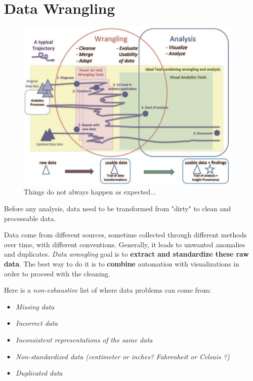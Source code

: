 
\section{Data Wrangling}

\begin{figure}[H]%
 \centering
 \includegraphics[width=12cm]{./img/03/path_data_wrangling}
 \caption{\label{path_data_wrangling}Things do not always happen as expected...}
\end{figure}

Before any analysis, data need to be transformed from "dirty" to clean and processable data.

Data come from different sources, sometime collected through different methods over time, with different conventions. Generally, it leads to unwanted anomalies and duplicates. \emph{Data wrangling} goal is to \textbf{extract and standardize these raw data}. The best way to do it is to \textbf{combine} automation with visualizations in order to proceed with the cleaning. 

Here is a \emph{non-exhaustive} list of where data problems can come from: 
\begin{itemize}
  \item \emph{Missing data}
  \item \emph{Incorrect data}
  \item \emph{Inconsistent representations of the same data}
  \item \emph{Non-standardized data (centimeter or inches? Fahrenheit or Celsuis ?)}
  \item \emph{Duplicated data}
\end{itemize}

